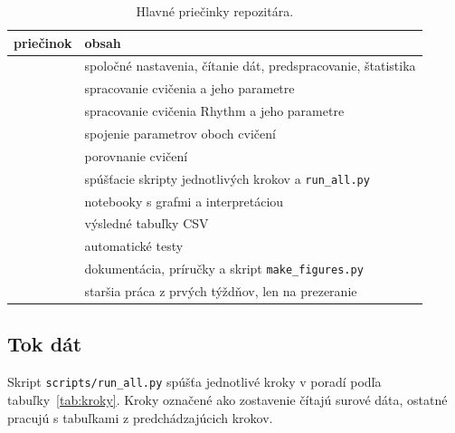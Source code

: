 \documentclass[12pt,a4paper]{article}
\begin{document}
\begin{table}[H]
\centering\small
\caption{Hlavné priečinky repozitára.}
\begin{tabularx}{\textwidth}{@{}>{\raggedright\arraybackslash}p{4.8cm} L@{}}
\toprule
priečinok & obsah \\
\midrule
{} & spoločné nastavenia, čítanie dát, predspracovanie, štatistika \\
 & spracovanie cvičenia \ef{} a jeho parametre \\
 & spracovanie cvičenia Rhythm a jeho parametre \\
 & spojenie parametrov oboch cvičení \\
 & porovnanie cvičení \\
 & spúšťacie skripty jednotlivých krokov a \texttt{run\_all.py} \\
 & notebooky s grafmi a interpretáciou \\
 & výsledné tabuľky CSV \\
 & automatické testy \\
 & dokumentácia, príručky a skript \texttt{make\_figures.py} \\
 & staršia práca z prvých týždňov, len na prezeranie \\
\bottomrule
\end{tabularx}
\end{table}

\subsection{Tok dát}

Skript \texttt{scripts/run\_all.py} spúšťa jednotlivé kroky v poradí podľa tabuľky~\ref{tab:kroky}. Kroky označené
ako zostavenie čítajú surové dáta, ostatné pracujú s tabuľkami z predchádzajúcich krokov.
\end{document}
